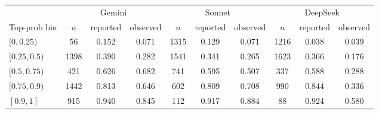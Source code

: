 \begin{tabular}{l*{9}{c}}
\toprule
 & \multicolumn{3}{c}{Gemini} & \multicolumn{3}{c}{Sonnet} & \multicolumn{3}{c}{DeepSeek}\\
\cmidrule(lr){2-4}\cmidrule(lr){5-7}\cmidrule(lr){8-10}
Top-prob bin & $n$ & reported & observed & $n$ & reported & observed & $n$ & reported & observed\\
\midrule
$[0,0.25)$  & 56  & 0.152  & 0.071  & 1315  & 0.129  & 0.071  & 1216  & 0.038  & 0.039\\
$[0.25,0.5)$  & 1398  & 0.390  & 0.282  & 1541  & 0.341  & 0.265  & 1623  & 0.366  & 0.176\\
$[0.5,0.75)$  & 421  & 0.626  & 0.682  & 741  & 0.595  & 0.507  & 337  & 0.588  & 0.288\\
$[0.75,0.9)$  & 1442  & 0.813  & 0.646  & 602  & 0.809  & 0.708  & 990  & 0.844  & 0.336\\
$[0.9,1]$  & 915  & 0.940  & 0.845  & 112  & 0.917  & 0.884  & 88  & 0.924  & 0.580\\
\bottomrule
\end{tabular}
